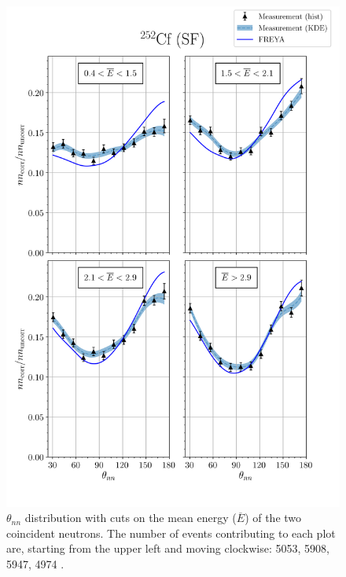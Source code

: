 \begin{figure}
\centering
    \includegraphics[width = \textwidth]{Content/Results/FinalCf252Resultw_freya1KDE.png}
    \caption{$\theta_{nn}$ distribution with cuts on the mean energy ($\overline{E}$) of the two coincident neutrons.
   The number of events contributing to each plot are, starting from the upper left and moving clockwise: 5053, 5908, 5947, 4974 . }
    \label{fig:Cf(1)}
\end{figure}
\FloatBarrier

